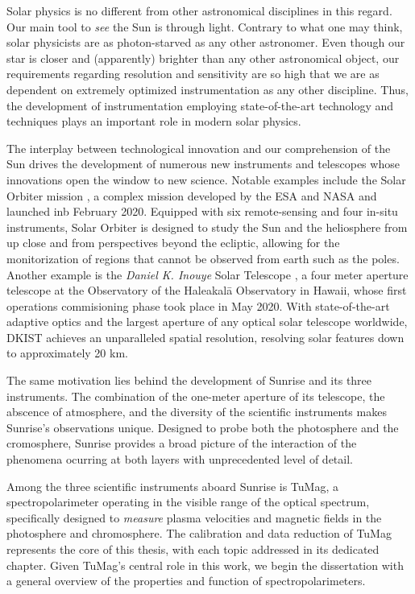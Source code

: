 Solar physics is no different from other astronomical disciplines in this regard. Our main tool to \textit{see} the Sun is through light. Contrary to what one may think, solar physicists are as photon-starved as any other astronomer. Even though our star is closer and (apparently) brighter than any other astronomical object, our requirements regarding resolution and sensitivity are so high that we are as dependent on extremely optimized instrumentation as any other discipline. Thus, the development of instrumentation employing state-of-the-art technology and techniques plays an important role in modern solar physics.

The interplay between technological innovation and our comprehension of the Sun drives the development of numerous new instruments and telescopes whose innovations open the window to new science. Notable examples include the Solar Orbiter mission \citep{SO}, a complex mission developed by the ESA and NASA and launched inb February 2020. Equipped with six remote-sensing and four in-situ instruments, Solar Orbiter is designed to study the Sun and the heliosphere from up close and from perspectives beyond the ecliptic, allowing for the monitorization of regions that cannot be observed from earth such as the poles. Another example is the \textit{Daniel K. Inouye} Solar Telescope \citep[DKIST;][]{DKIST}, a four meter aperture telescope at the Observatory of the Haleakal\=a Observatory in Hawaii, whose first operations commisioning phase took place in May 2020. With state-of-the-art adaptive optics and the largest aperture of any optical solar telescope worldwide, DKIST achieves an unparalleled spatial resolution, resolving solar features down to approximately 20 km. 

The same motivation lies behind the development of Sunrise and its three instruments.  The combination of the one-meter aperture of its telescope, the abscence of atmosphere, and the diversity of the scientific instruments makes Sunrise's observations unique. Designed to probe both the photosphere and the cromosphere, Sunrise provides a broad picture of the interaction of the phenomena ocurring at both layers with unprecedented level of detail.

Among the three scientific instruments aboard Sunrise is TuMag, a spectropolarimeter operating in the visible range of the optical spectrum, specifically designed to \textit{measure} plasma velocities and magnetic fields in the photosphere and chromosphere. The calibration and data reduction of TuMag represents the core of this thesis, with each topic addressed in its dedicated chapter. Given TuMag’s central role in this work, we begin the dissertation with a general overview of the properties and function of spectropolarimeters.


